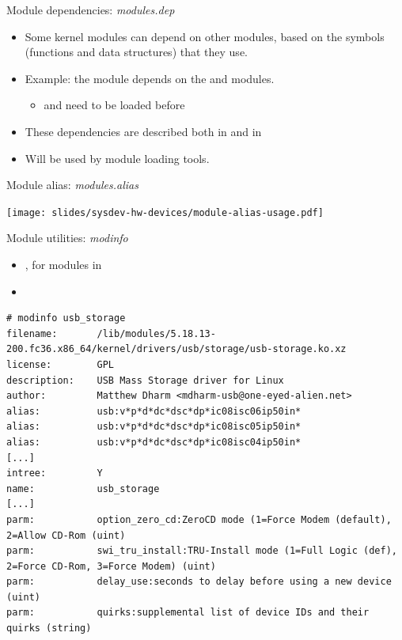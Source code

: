 \begin{frame}{Module dependencies: {\em modules.dep}}
  \begin{itemize}
  \item Some kernel modules can depend on other modules, based on the
    symbols (functions and data structures) that they use.
  \item Example: the  module depends on the  and
     modules.
    \begin{itemize}
    \item {} and  need to be loaded before 
    \end{itemize}
  \item These dependencies are described both in
     and in
  \item Will be used by module loading tools.
  \end{itemize}
\end{frame}

\begin{frame}{Module alias: {\em modules.alias}}
  \begin{center}
    \texttt{[image: slides/sysdev-hw-devices/module-alias-usage.pdf]}
  \end{center}
\end{frame}

\begin{frame}[fragile]{Module utilities: {\em modinfo}}
  \begin{itemize}
  \item {}, for modules in 
  \item {}
  \end{itemize}

  \begin{block}{}
    {\tiny
\begin{verbatim}
# modinfo usb_storage
filename:       /lib/modules/5.18.13-200.fc36.x86_64/kernel/drivers/usb/storage/usb-storage.ko.xz
license:        GPL
description:    USB Mass Storage driver for Linux
author:         Matthew Dharm <mdharm-usb@one-eyed-alien.net>
alias:          usb:v*p*d*dc*dsc*dp*ic08isc06ip50in*
alias:          usb:v*p*d*dc*dsc*dp*ic08isc05ip50in*
alias:          usb:v*p*d*dc*dsc*dp*ic08isc04ip50in*
[...]
intree:         Y
name:           usb_storage
[...]
parm:           option_zero_cd:ZeroCD mode (1=Force Modem (default), 2=Allow CD-Rom (uint)
parm:           swi_tru_install:TRU-Install mode (1=Full Logic (def), 2=Force CD-Rom, 3=Force Modem) (uint)
parm:           delay_use:seconds to delay before using a new device (uint)
parm:           quirks:supplemental list of device IDs and their quirks (string)
\end{verbatim}
    }
  \end{block}
\end{frame}


